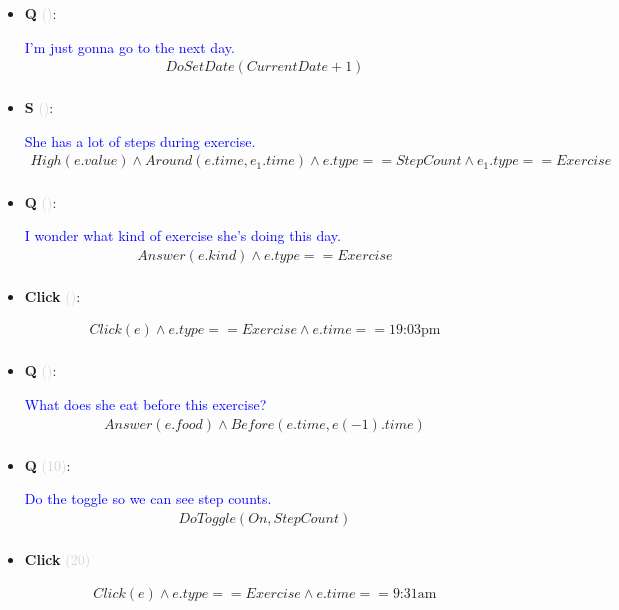 \documentclass[11pt]{article}
\newcounter{CQ}
\newcounter{CS}
\newcounter{CClick}
\newcommand{\key}[1]{\textcolor{lightgray}{#1}}
\begin{document}
\begin{itemize}
	\item
	\textbf{Q\theCQ} \key{()}: \addtocounter{CQ}{1}
	\textcolor{blue}{ I'm just gonna go to the next day. }
	\begin{multline*}
	DoSetDate(CurrentDate + 1) \\
	\end{multline*}
	

	\item
	\textbf{S\theCS} \key{()}: \addtocounter{CS}{1}
	\textcolor{blue}{ She has a lot of steps during exercise. }
	\begin{multline*}
	High(e.value) \wedge Around(e.time, e_1.time) \wedge e.type == StepCount \wedge e_1.type==Exercise  \\
	\end{multline*}
	
	\item
	\textbf{Q\theCQ} \key{()}: \addtocounter{CQ}{1}
	\textcolor{blue}{ I wonder what kind of exercise she's doing this day. }
	\begin{multline*}
	Answer(e.kind) \wedge e.type == Exercise \\
	\end{multline*}
	
	\item
	\textbf{Click\theCClick} \key{()}: \addtocounter{CClick}{1}
	\begin{multline*}
	Click(e) \wedge e.type == Exercise \wedge e.time == \mbox{19:03pm}  \\
	\end{multline*}
	
	\item
	\textbf{Q\theCQ} \key{()}: \addtocounter{CQ}{1}
	\textcolor{blue}{ What does she eat before this exercise? }
	\begin{multline*}
	Answer(e.food) \wedge Before(e.time, e(-1).time) \\
	\end{multline*}
	

	\item
	\textbf{Q\theCQ} \key{(10)}: \addtocounter{CQ}{1}
	\textcolor{blue}{ Do the toggle so we can see step counts. }
	\begin{multline*}
	DoToggle(On, StepCount) \\
	\end{multline*}
	

	\item
	\textbf{Click\theCClick} \key{(20)} \addtocounter{CClick}{1}
	\begin{multline*}
	Click(e) \wedge e.type == Exercise \wedge e.time == \mbox{9:31am}  \\
	\end{multline*}
	

\end{itemize}
\end{document}
